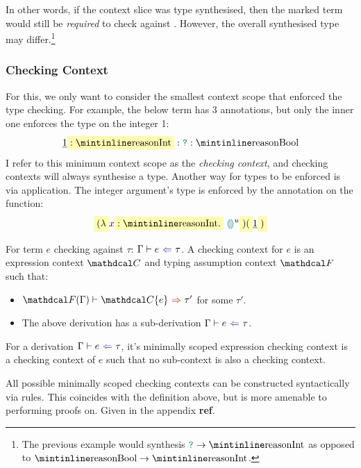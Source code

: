 In other words, if the context slice was type synthesised, then the marked term would still be \textit{required} to check against . However, the overall synthesised type may differ.\footnote{The previous example would synthesis $\dyn \to \code{Int}$ as opposed to $\code{Bool} \to \code{Int}$.}


\subsubsection{Checking Context}
For this, we only want to consider the smallest context scope that enforced the type checking. For example, the below term has 3 annotations, but only the inner one enforces the  type on the integer 1:
\[\underline{1} \hlcmaths[yellow!30]{: \code{Int}} : \dyn : \code{Bool}\]
I refer to this minimum context scope as the \textit{checking context}, and checking contexts will always synthesise a type. Another way for types to be enforced is via application. The integer argument's type is enforced by the annotation on the function:
\[\hlcmaths[yellow!30]{(\lambda} x \hlcmaths[yellow!30]{: \code{Int}.}\ \hole^u\hlcmaths[yellow!30]{)(}\underline{1}\hlcmaths[yellow!30]{)}\]


\begin{definition}
\label{def:CheckingContext}
For term $e$ checking against $\tau$: $\analysis[\Gamma]{e}{\tau}$. A checking context for $e$ is an expression context $\C$ and typing assumption context $\F$ such that: 
\begin{itemize}
\item $\synthesis[\F(\Gamma)]{\C\{e\}}{\tau'}$ for some $\tau'$.
\item The above derivation has a sub-derivation $\analysis[\Gamma]{e}{\tau}$.
\end{itemize}
\end{definition}
\begin{definition}
For a derivation $\analysis[\Gamma]{e}{\tau}$, it's minimally scoped expression checking context is a checking context of $e$ such that no sub-context is also a checking context.
\end{definition}

All possible minimally scoped checking contexts can be constructed syntactically via rules. This coincides with the definition above, but is more amenable to performing proofs on. Given in the appendix \textbf{ref}.

